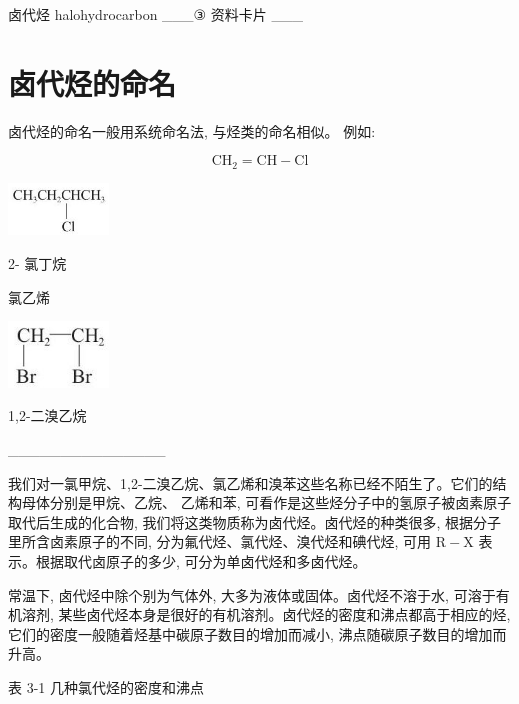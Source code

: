 \documentclass[10pt]{article}
\begin{document}
卤代烃 halohydrocarbon \_\_\_③ 资料卡片 \_\_\_

\section*{卤代烃的命名}

卤代烃的命名一般用系统命名法, 与烃类的命名相似。 例如:

\[
{\mathrm{{CH}}}_{2} = \mathrm{{CH}} - \mathrm{{Cl}}
\]

\begin{center}
\includegraphics[max width=0.2\textwidth]{images/0190efc5-b58a-7c43-bfb0-e0a030df9cfd_59_274993.jpg}
\end{center}

2- 氯丁烷

氯乙烯

\begin{center}
\includegraphics[max width=0.2\textwidth]{images/0190efc5-b58a-7c43-bfb0-e0a030df9cfd_59_676216.jpg}
\end{center}

1,2-二溴乙烷

\_\_\_\_\_\_\_\_\_\_\_\_\_\_\_

我们对一氯甲烷、1,2-二溴乙烷、氯乙烯和溴苯这些名称已经不陌生了。它们的结构母体分别是甲烷、乙烷、 乙烯和苯, 可看作是这些烃分子中的氢原子被卤素原子取代后生成的化合物, 我们将这类物质称为卤代烃。卤代烃的种类很多, 根据分子里所含卤素原子的不同, 分为氟代烃、氯代烃、溴代烃和碘代烃, 可用 \(\mathrm{R} - \mathrm{X}\) 表示。根据取代卤原子的多少, 可分为单卤代烃和多卤代烃。

常温下, 卤代烃中除个别为气体外, 大多为液体或固体。卤代烃不溶于水, 可溶于有机溶剂, 某些卤代烃本身是很好的有机溶剂。卤代烃的密度和沸点都高于相应的烃, 它们的密度一般随着烃基中碳原子数目的增加而减小, 沸点随碳原子数目的增加而升高。

表 3-1 几种氯代烃的密度和沸点
\end{document}
